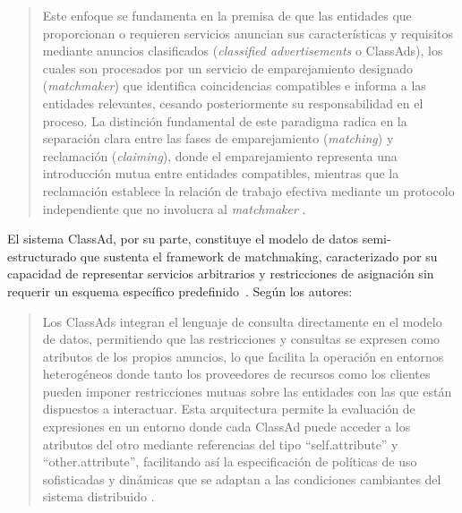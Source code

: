 \begin{quote}
	Este enfoque se fundamenta en la premisa de que las entidades que proporcionan o requieren servicios anuncian sus características y requisitos mediante anuncios clasificados (\textit{classified advertisements} o ClassAds), los cuales son procesados por un servicio de emparejamiento designado (\textit{matchmaker}) que identifica coincidencias compatibles e informa a las entidades relevantes, cesando posteriormente su responsabilidad en el proceso. La distinción fundamental de este paradigma radica en la separación clara entre las fases de emparejamiento (\textit{matching}) y reclamación (\textit{claiming}), donde el emparejamiento representa una introducción mutua entre entidades compatibles, mientras que la reclamación establece la relación de trabajo efectiva mediante un protocolo independiente que no involucra al \textit{matchmaker} \citep{Raman1998}.
\end{quote}

\noindent
El sistema ClassAd, por su parte, constituye el modelo de datos semi-estructurado que sustenta el framework de matchmaking, caracterizado por su capacidad de representar servicios arbitrarios y restricciones de asignación sin requerir un esquema específico predefinido~\cite{Raman1998}. Según los autores:
\begin{quote}
	Los ClassAds integran el lenguaje de consulta directamente en el modelo de datos, permitiendo que las restricciones y consultas se expresen como atributos de los propios anuncios, lo que facilita la operación en entornos heterogéneos donde tanto los proveedores de recursos como los clientes pueden imponer restricciones mutuas sobre las entidades con las que están dispuestos a interactuar. Esta arquitectura permite la evaluación de expresiones en un entorno donde cada ClassAd puede acceder a los atributos del otro mediante referencias del tipo ``self.attribute'' y ``other.attribute'', facilitando así la especificación de políticas de uso sofisticadas y dinámicas que se adaptan a las condiciones cambiantes del sistema distribuido \cite{Raman1998}.
\end{quote}

